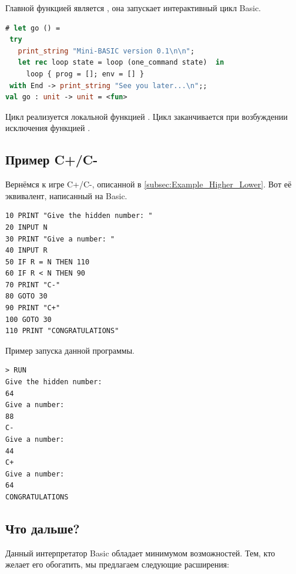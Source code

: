 Главной функцией является , она запускает интерактивный цикл Basic.

\begin{lstlisting}[language=OCaml]
# let go () = 
 try 
   print_string "Mini-BASIC version 0.1\n\n";
   let rec loop state = loop (one_command state)  in 
     loop { prog = []; env = [] }
 with End -> print_string "See you later...\n";;
val go : unit -> unit = <fun>
\end{lstlisting}

Цикл реализуется локальной функцией . Цикл заканчивается при 
возбуждении исключения  функцией .

\subsection{Пример C+/C-}
\label{subsubsec:example_C_pm}

Вернёмся к игре C+/C-, описанной в \ref{subsec:Example_Higher_Lower}. Вот её 
эквивалент, написанный на Basic.

\begin{lstlisting}[language={[Visual]Basic}]
10 PRINT "Give the hidden number: "
20 INPUT N
30 PRINT "Give a number: "
40 INPUT R
50 IF R = N THEN 110
60 IF R < N THEN 90
70 PRINT "C-"
80 GOTO 30
90 PRINT "C+"
100 GOTO 30
110 PRINT "CONGRATULATIONS"
\end{lstlisting}

Пример запуска данной программы.

\begin{lstlisting}
> RUN
Give the hidden number:
64
Give a number:
88
C-
Give a number:
44
C+
Give a number:
64
CONGRATULATIONS
\end{lstlisting}

\subsection{Что дальше?}
\label{subsubsec:further_work}

Данный интерпретатор Basic обладает минимумом возможностей. Тем, кто желает его 
обогатить, мы предлагаем следующие расширения:

